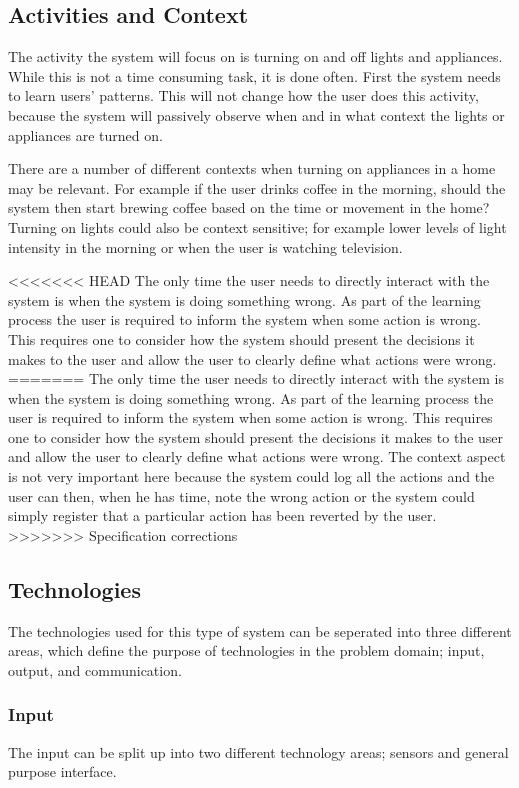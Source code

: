 \subsection{Activities and Context}
The activity the system will focus on is turning on and off lights and
appliances. While this is not a time consuming task, it is done often. First the
system needs to learn users' patterns. This will not change how the user does
this activity, because the system will passively observe when and in what
context the lights or appliances are turned on.

There are a number of different
contexts when turning on appliances in a home may be relevant.
For example if the user drinks coffee in the morning, should the system then
start brewing coffee based on the time or movement in the home? Turning on
lights could also be context sensitive; for example lower levels of light
intensity in the morning or when the user is watching television.

<<<<<<< HEAD
The only time the user needs to directly interact with the system is when the system is doing something wrong. As part of the learning process the user is required to inform the system when some action is wrong. This requires one to consider how the system should present the decisions it makes to the user and allow the user to clearly define what actions were wrong.
=======
The only time the user needs to directly interact with the system is when the system is doing something wrong. As part of the learning process the user is required to inform the system when some action is wrong. This requires one to consider how the system should present the decisions it makes to the user and allow the user to clearly define what actions were wrong. The context aspect is not very important here because the system could log all the actions and the user can then, when he has time, note the wrong action or the system could simply register that a particular action has been reverted by the user. 
>>>>>>> Specification corrections

\subsection{Technologies}
\label{sub:Technologies}
The technologies used for this type of system can be seperated into three different areas, which define the purpose of technologies in the problem domain; input, output, and communication.
\subsubsection{Input}
The input can be split up into two different technology areas; sensors and general purpose interface.


